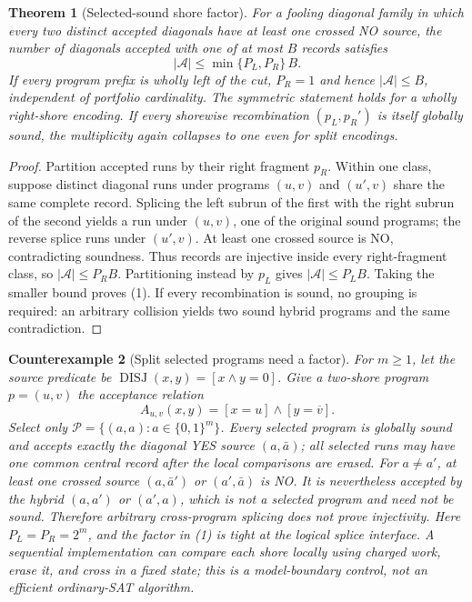 \documentclass[11pt]{article}
\newtheorem{theorem}{Theorem}
\newtheorem{counterexample}[theorem]{Counterexample}
\begin{document}
\begin{theorem}[Selected-sound shore factor]\label{t:shore}
For a fooling diagonal family in which every two distinct accepted
diagonals have at least one crossed NO source, the number of diagonals
accepted with one of at most $B$ records satisfies
\[
 |\mathcal A|\le \min\{P_L,P_R\}\,B.                 \tag{1}
\]
If every program prefix is wholly left of the cut, $P_R=1$ and hence
$|\mathcal A|\le B$, independent of portfolio cardinality.  The symmetric
statement holds for a wholly right-shore encoding.  If every shorewise
recombination $(p_L,p_R')$ is itself globally sound, the multiplicity again
collapses to one even for split encodings.
\end{theorem}
\begin{proof}
Partition accepted runs by their right fragment $p_R$.  Within one class,
suppose distinct diagonal runs under programs $(u,v)$ and $(u',v)$ share
the same complete record.  Splicing the left subrun of the first with the
right subrun of the second yields a run under $(u,v)$, one of the original
sound programs; the reverse splice runs under $(u',v)$.  At least one
crossed source is NO, contradicting soundness.  Thus records are injective
inside every right-fragment class, so $|\mathcal A|\le P_RB$.  Partitioning
instead by $p_L$ gives $|\mathcal A|\le P_LB$.  Taking the smaller bound
proves (1).  If every recombination is sound, no grouping is required:
an arbitrary collision yields two sound hybrid programs and the same
contradiction.
\end{proof}

\begin{counterexample}[Split selected programs need a factor]\label{c:split}
For $m\ge1$, let the source predicate be
$\operatorname{DISJ}(x,y)=[x\wedge y=0]$.  Give a two-shore program
$p=(u,v)$ the acceptance relation
\[
 A_{u,v}(x,y)=[x=u]\wedge[y=\overline v].            \tag{2}
\]
Select only $\mathcal P=\{(a,a):a\in\{0,1\}^m\}$.  Every selected program
is globally sound and accepts exactly the diagonal YES source
$(a,\bar a)$; all selected runs may have one common central record after
the local comparisons are erased.  For $a\ne a'$, at least one crossed
source $(a,\bar a')$ or $(a',\bar a)$ is NO.  It is nevertheless accepted
by the hybrid $(a,a')$ or $(a',a)$, which is not a selected program and need
not be sound.  Therefore arbitrary cross-program splicing does not prove
injectivity.  Here $P_L=P_R=2^m$, and the factor in (1) is tight at the
logical splice interface.  A sequential implementation can compare each
shore locally using charged work, erase it, and cross in a fixed state; this
is a model-boundary control, not an efficient ordinary-SAT algorithm.
\end{counterexample}
\end{document}
